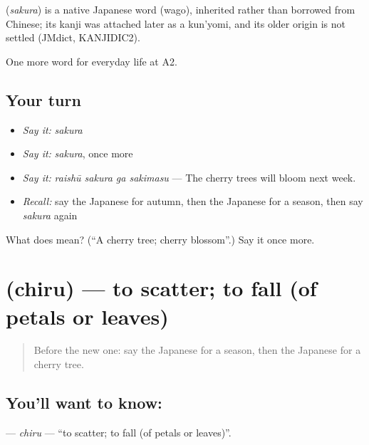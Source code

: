 \begin{cousinweb}
\textbf{} (\emph{sakura}) is a native Japanese word (wago), inherited rather than borrowed from Chinese; its kanji was attached later as a kun'yomi, and its older origin is not settled (JMdict, KANJIDIC2).
\end{cousinweb}

\begin{grammarlens}[title={What you've built}]
One more word for everyday life at A2.
\end{grammarlens}

\subsection*{Your turn}
\begin{itemize}
\raggedright
  \item \emph{Say it:} \emph{sakura}
  \item \emph{Say it:} \emph{sakura}, once more
  \item \emph{Say it:} \emph{raishū sakura ga sakimasu} — The cherry trees will bloom next week.
  \item \emph{Recall:} say the Japanese for autumn, then the Japanese for a season, then say \emph{sakura} again
\end{itemize}

\begin{tcolorbox}[breakable,colback=teal!4,colframe=teal!35!black,title={Before you move on}]
What does  mean? (\textquotedblleft{}A cherry tree; cherry blossom\textquotedblright{}.) Say it once more.
\end{tcolorbox}
\section[\texorpdfstring{\ja{ちる} (chiru)}{ちる (chiru)}]{ (chiru) — to scatter; to fall (of petals or leaves)}

\label{lesson:JA-C209-chiru}



\begin{quote}
Before the new one: say the Japanese for a season, then the Japanese for a cherry tree.
\end{quote}

\subsection*{You'll want to know: }
\textbf{} — \emph{chiru} — \textquotedblleft{}to scatter; to fall (of petals or leaves)\textquotedblright{}.

